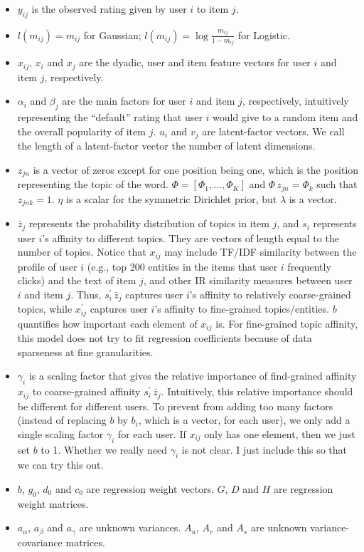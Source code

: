 \begin{itemize}
\item $y_{ij}$ is the observed rating given by user $i$ to item $j$.

\item $l(m_{ij}) = m_{ij}$ for Gaussian; $l(m_{ij}) = \log\frac{m_{ij}}{1-m_{ij}}$ for Logistic.

\item $x_{ij}$, $x_i$ and $x_j$ are the dyadic, user and item feature vectors for user $i$ and item $j$, respectively.

\item $\alpha_i$ and $\beta_j$ are the main factors for user $i$ and item $j$, respectively, intuitively representing the ``default'' rating that user $i$ would give to a random item and the overall popularity of item $j$. $u_i$ and $v_j$ are latent-factor vectors. We call the length of a latent-factor vector the number of latent dimensions.

\item $z_{jn}$ is a vector of zeros except for one position being one, which is the position representing the topic of the word. $\Phi = [\Phi_1, ..., \Phi_K]$ and $\Phi \, z_{jn} = \Phi_k$ such that $z_{jnk} = 1$. $\eta$ is a scalar for the symmetric Dirichlet prior, but $\lambda$ is a vector.

\item $\bar{z}_j$ represents the probability distribution of topics in item $j$, and $s_i$ represents user $i$'s affinity to different topics. They are vectors of length equal to the number of topics. Notice that $x_{ij}$ may include TF/IDF similarity
between the profile of user $i$ (e.g., top 200 entities in the items
that user $i$ frequently clicks) and the text of item $j$, and other
IR similarity measures between user $i$ and item $j$.  Thus,
$s_{i}^{\prime} \, \bar{z}_{j}$ captures user $i$'s affinity to
relatively coarse-grained topics, while $x_{ij}^{\prime}$ captures
user $i$'s affinity to fine-grained topics/entities. $b$ quantifies
how important each element of $x_{ij}$ is. For fine-grained
topic affinity, this model does not try to fit regression coefficients
because of data sparseness at fine granularities.

\item $\gamma_i$ is a scaling factor that gives the relative
importance of find-grained affinity $x_{ij}$ to coarse-grained
affinity $s_{i}^{\prime} \, \bar{z}_{j}$. Intuitively, this relative
importance should be different for different users. To prevent from
adding too many factors (instead of replacing $b$ by $b_i$, which is a
vector, for each user), we only add a single scaling factor $\gamma_i$
for each user.  If $x_{ij}$ only has one element, then we just set $b$
to 1. Whether we really need $\gamma_i$ is not clear. I just include this so that we can try this out.

\item $b$, $g_0$, $d_0$ and $c_0$ are regression weight vectors. $G$, $D$ and $H$ are regression weight matrices.

\item $a_{\alpha}$, $a_{\beta}$ and $a_\gamma$ are unknown variances. $A_u$, $A_v$ and $A_s$ are unknown variance-covariance matrices.

\end{itemize}
